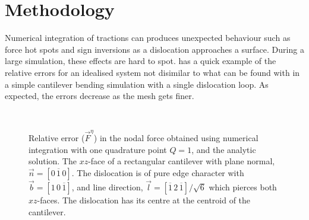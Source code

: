\documentclass[11pt]{iopart}
\begin{document}
\section{Methodology}\label{s:method}
Numerical integration of tractions can produces unexpected behaviour such as force hot spots and sign inversions as a dislocation approaches a surface. During a large simulation, these effects are hard to spot.  has a quick example of the relative errors for an idealised system not disimilar to what can be found with in a simple cantilever bending simulation with a single dislocation loop. As expected, the errors decrease as the mesh gets finer.
\begin{figure}
    \centering
    ~
    \caption{Relative error ($\vec{F}^{\eta}$) in the nodal force obtained using numerical integration with one quadrature point $Q = 1$, and the analytic solution. The $xz$-face of a rectangular cantilever with plane normal, $\vec{n} = \left[0\,\overline{1}\,0\right]$. The dislocation is of pure edge character with $\vec{b} = [1\,0\,\overline{1}]$, and line direction, $\vec{l} = \left[\overline{1}\,2\,\overline{1}\right]/\sqrt{6}$ which pierces both $xz$-faces. The dislocation has its centre at the centroid of the cantilever.}
    \label{f:err_basic_cantilever}
\end{figure}
\end{document}
